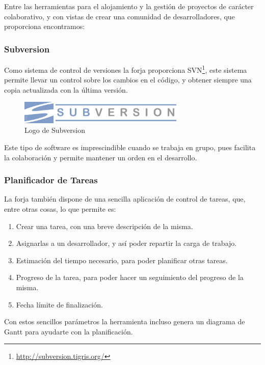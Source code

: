 Entre las herramientas para el alojamiento y la gestión de proyectos de carácter
colaborativo, y con vistas de crear una comunidad de desarrolladores, que
proporciona encontramos:

\subsubsection*{Subversion}

Como sistema de control de versiones la forja proporciona
SVN\footnote{\url{http://subversion.tigris.org/}}, este sistema permite llevar
un control sobre los cambios en el código, y obtener siempre una copia
actualizada con la última versión.

\begin{figure}[H]
 \centering
 \includegraphics[width=80mm]{figuras/cap5/svn.png}
 \caption{Logo de Subversion}
\end{figure}

Este tipo de software es imprescindible cuando se trabaja en grupo, pues
facilita la colaboración y permite mantener un orden en el desarrollo.

\subsubsection*{Planificador de Tareas}

La forja también dispone de una sencilla aplicación de control de tareas, que,
entre otras cosas, lo que permite es:

\begin{enumerate}
 \item Crear una tarea, con una breve descripción de la misma.
 \item Asignarlas a un desarrollador, y así poder repartir la carga de trabajo.
 \item Estimación del tiempo necesario, para poder planificar otras tareas.
 \item Progreso de la tarea, para poder hacer un seguimiento del progreso de la
 misma.
 \item Fecha límite de finalización.
\end{enumerate}

Con estos sencillos parámetros la herramienta incluso genera un diagrama de
Gantt para ayudarte con la planificación.


